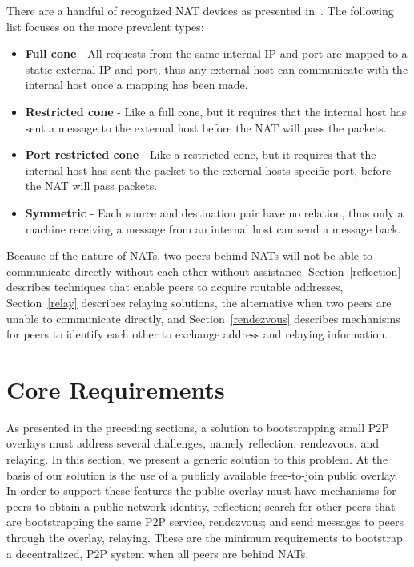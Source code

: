 \documentclass[conference]{IEEEtran}
\begin{document}
There are a handful of recognized NAT devices as presented in~\cite{stun,
p2p_nats_rfc}.  The following list focuses on the more prevalent types:
\begin{itemize}
\item \textbf{Full cone} - All requests from the same internal IP and port are
mapped to a static external IP and port, thus any external host can communicate
with the internal host once a mapping has been made.
\item \textbf{Restricted cone} - Like a full cone, but it requires that the
internal host has sent a message to the external host before the NAT will pass
the packets.
\item \textbf{Port restricted cone} - Like a restricted cone, but it requires
that the internal host has sent the packet to the external hosts specific port,
before the NAT will pass packets.
\item \textbf{Symmetric} - Each source and destination pair have no relation,
thus only a machine receiving a message from an internal host can send a
message back.
\end{itemize}

Because of the nature of NATs, two peers behind NATs will not be able to
communicate directly without each other without assistance.
Section~\ref{reflection} describes techniques that enable peers to acquire
routable addresses, Section~\ref{relay} describes relaying solutions, the
alternative when two peers are unable to communicate directly, and
Section~\ref{rendezvous} describes mechanisms for peers to identify each
other to exchange address and relaying information.

\section{Core Requirements}
\label{overview}

As presented in the preceding sections, a solution to bootstrapping small P2P
overlays must address several challenges, namely reflection, rendezvous, and
relaying.  In this section, we present a generic solution to this problem.  At
the basis of our solution is the use of a publicly available free-to-join
public overlay.  In order to support these features the public overlay must
have mechanisms for peers to obtain a public network identity, reflection;
search for other peers that are bootstrapping the same P2P service, rendezvous;
and send messages to peers through the overlay, relaying.  These are the
minimum requirements to bootstrap a decentralized, P2P system when all peers
are behind NATs.
\end{document}

